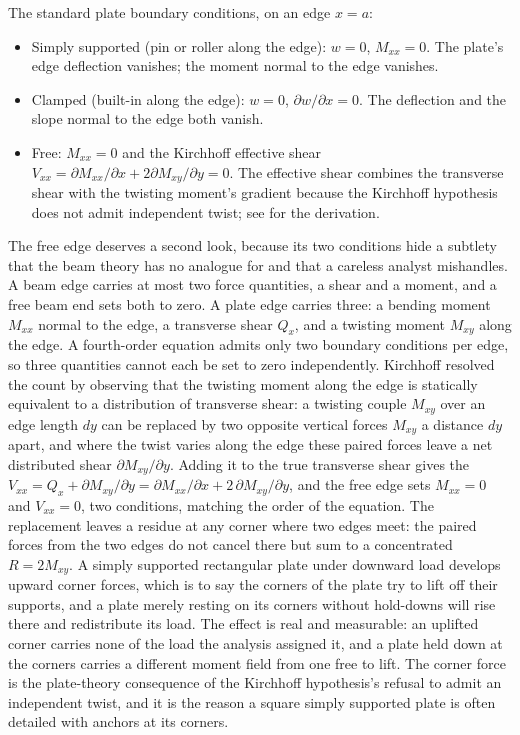 The standard plate boundary conditions, on an edge $x = a$:

\begin{itemize}[leftmargin=*]
  \item Simply supported (pin or roller along the edge):
    $w = 0$, $M_{xx} = 0$. The plate's edge deflection vanishes;
    the moment normal to the edge vanishes.
  \item Clamped (built-in along the edge): $w = 0$, $\partial w/
    \partial x = 0$. The deflection and the slope normal to the
    edge both vanish.
  \item Free: $M_{xx} = 0$ and the Kirchhoff effective shear $V_{xx}
    = \partial M_{xx}/\partial x + 2 \partial M_{xy}/\partial y = 0$.
    The effective shear combines the transverse shear with the
    twisting moment's gradient because the Kirchhoff hypothesis does
    not admit independent twist; see \cite[ch.~2]{
    text:timoshenko-plates-shells} for the derivation.
\end{itemize}

The free edge deserves a second look, because its two conditions hide a
subtlety that the beam theory has no analogue for and that a careless analyst
mishandles. A beam edge carries at most two force quantities, a shear and a
moment, and a free beam end sets both to zero. A plate edge carries three: a
bending moment $M_{xx}$ normal to the edge, a transverse shear $Q_x$, and a
twisting moment $M_{xy}$ along the edge. A fourth-order equation admits only
two boundary conditions per edge, so three quantities cannot each be set to
zero independently. Kirchhoff resolved the count by observing that the
twisting moment along the edge is statically equivalent to a distribution of
transverse shear: a twisting couple $M_{xy}$ over an edge length $dy$ can be
replaced by two opposite vertical forces $M_{xy}$ a distance $dy$ apart, and
where the twist varies along the edge these paired forces leave a net
distributed shear $\partial M_{xy}/\partial y$. Adding it to the true
transverse shear gives the  $V_{xx} =
Q_x + \partial M_{xy}/\partial y = \partial M_{xx}/\partial x + 2\,\partial
M_{xy}/\partial y$, and the free edge sets $M_{xx} = 0$ and $V_{xx} = 0$, two
conditions, matching the order of the equation. The replacement leaves a
residue at any corner where two edges meet: the paired forces from the two
edges do not cancel there but sum to a concentrated 
$R = 2 M_{xy}$. A simply supported rectangular plate under downward load
develops upward corner forces, which is to say the corners of the plate try to
lift off their supports, and a plate merely resting on its corners without
hold-downs will rise there and redistribute its load. The effect is real and
measurable: an uplifted corner carries none of the load the analysis assigned
it, and a plate held down at the corners carries a different moment field from
one free to lift. The corner force is the plate-theory consequence of the
Kirchhoff hypothesis's refusal to admit an independent twist, and it is the
reason a square simply supported plate is often detailed with anchors at its
corners.

